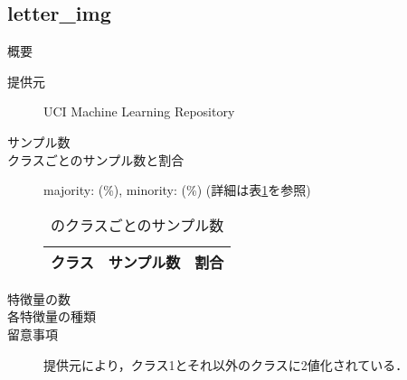 \subsection{letter\_img}
\begin{description}
    \item[概要] \cite{}
    \item[提供元] UCI Machine Learning Repository
    \item[サンプル数] 
    \item[クラスごとのサンプル数と割合] majority:  (\%), minority:  (\%) (詳細は表\ref{tab:}を参照)

        \begin{table}
            \centering
            \caption{のクラスごとのサンプル数}
            \label{tab:}
            \begin{tabular}{lrc} \hline
                \multicolumn{1}{c}{クラス}&
                \multicolumn{1}{c}{サンプル数}&
                \multicolumn{1}{c}{割合}\\
                \hline
                \hline

                \hline
            \end{tabular}
        \end{table}

    \item[特徴量の数] 
    \item[各特徴量の種類] \mbox{}
        
    \item[留意事項] 提供元により，クラス1とそれ以外のクラスに2値化されている．
\end{description}


